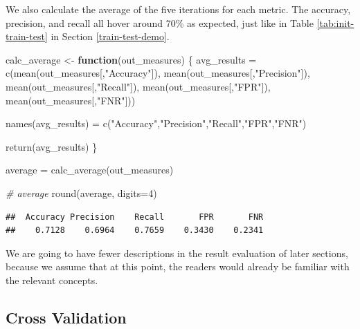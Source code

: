 \documentclass[
]{article}
\newenvironment{Shaded}{\begin{snugshade}}{\end{snugshade}}
\newcommand{\AttributeTok}[1]{\textcolor[rgb]{0.77,0.63,0.00}{#1}}
\newcommand{\CommentTok}[1]{\textcolor[rgb]{0.56,0.35,0.01}{\textit{#1}}}
\newcommand{\ControlFlowTok}[1]{\textcolor[rgb]{0.13,0.29,0.53}{\textbf{#1}}}
\newcommand{\DecValTok}[1]{\textcolor[rgb]{0.00,0.00,0.81}{#1}}
\newcommand{\FunctionTok}[1]{\textcolor[rgb]{0.00,0.00,0.00}{#1}}
\newcommand{\NormalTok}[1]{#1}
\newcommand{\OtherTok}[1]{\textcolor[rgb]{0.56,0.35,0.01}{#1}}
\newcommand{\StringTok}[1]{\textcolor[rgb]{0.31,0.60,0.02}{#1}}
\begin{document}
We also calculate the average of the five iterations for each metric.
The accuracy, precision, and recall all hover around 70\% as expected,
just like in Table \ref{tab:init-train-test} in Section
\ref{train-test-demo}.

\begin{Shaded}
\begin{Highlighting}[]
\NormalTok{calc\_average }\OtherTok{\textless{}{-}} \ControlFlowTok{function}\NormalTok{(out\_measures) \{}
\NormalTok{  avg\_results }\OtherTok{=} \FunctionTok{c}\NormalTok{(}\FunctionTok{mean}\NormalTok{(out\_measures[,}\StringTok{"Accuracy"}\NormalTok{]),}
            \FunctionTok{mean}\NormalTok{(out\_measures[,}\StringTok{"Precision"}\NormalTok{]),}
            \FunctionTok{mean}\NormalTok{(out\_measures[,}\StringTok{"Recall"}\NormalTok{]),}
            \FunctionTok{mean}\NormalTok{(out\_measures[,}\StringTok{"FPR"}\NormalTok{]), }\FunctionTok{mean}\NormalTok{(out\_measures[,}\StringTok{"FNR"}\NormalTok{]))}

  \FunctionTok{names}\NormalTok{(avg\_results) }\OtherTok{=} \FunctionTok{c}\NormalTok{(}\StringTok{"Accuracy"}\NormalTok{,}\StringTok{"Precision"}\NormalTok{,}\StringTok{"Recall"}\NormalTok{,}\StringTok{"FPR"}\NormalTok{,}\StringTok{"FNR"}\NormalTok{)}
  
  \FunctionTok{return}\NormalTok{(avg\_results)}
\NormalTok{\}}

\NormalTok{average }\OtherTok{=} \FunctionTok{calc\_average}\NormalTok{(out\_measures)}

\CommentTok{\# average}
\FunctionTok{round}\NormalTok{(average, }\AttributeTok{digits=}\DecValTok{4}\NormalTok{)}
\end{Highlighting}
\end{Shaded}

\begin{verbatim}
##  Accuracy Precision    Recall       FPR       FNR 
##    0.7128    0.6964    0.7659    0.3430    0.2341
\end{verbatim}

We are going to have fewer descriptions in the result evaluation of
later sections, because we assume that at this point, the readers would
already be familiar with the relevant concepts.

\hypertarget{cross-validation}{%
\subsection{Cross Validation}\label{cross-validation}}
\end{document}
